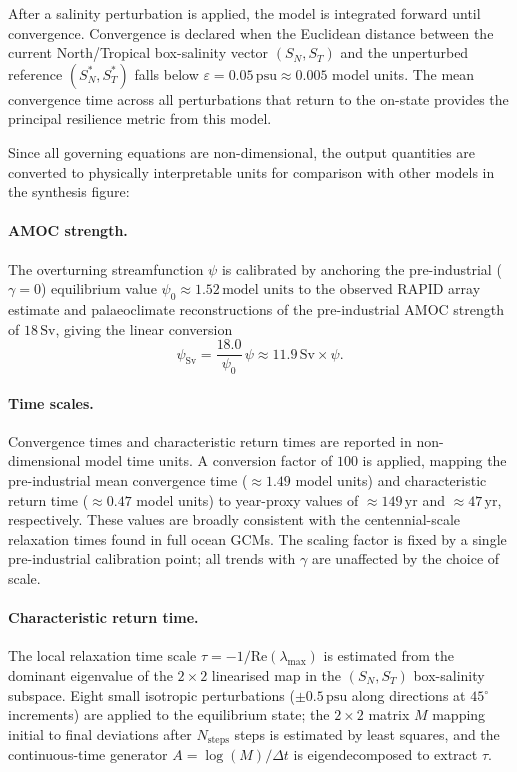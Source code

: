 \documentclass[12pt, a4paper]{article}
\newcommand{\psu}{\,\text{psu}}
\begin{document}
After a salinity perturbation is applied, the model is integrated forward
until convergence. Convergence is declared when the Euclidean distance between
the current North/Tropical box-salinity vector $(S_N, S_T)$ and the
unperturbed reference $(S_N^*, S_T^*)$ falls below
$\varepsilon = 0.05\psu{} \approx 0.005$ model units. The mean convergence
time across all perturbations that return to the on-state provides the
principal resilience metric from this model.

Since all governing equations are non-dimensional, the output quantities are
converted to physically interpretable units for comparison with other models
in the synthesis figure:

\paragraph{AMOC strength.}
The overturning streamfunction $\psi$ is calibrated by anchoring the
pre-industrial ($\gamma = 0$) equilibrium value
$\psi_0 \approx 1.52\,\text{model units}$ to the observed RAPID array estimate
and palaeoclimate reconstructions of the pre-industrial AMOC strength of
$18\,\text{Sv}$, giving the linear conversion
\begin{equation}
  \psi_\mathrm{Sv} = \frac{18.0}{\psi_0}\,\psi
  \approx 11.9\,\text{Sv}\times\psi.
\end{equation}

\paragraph{Time scales.}
Convergence times and characteristic return times are reported in
non-dimensional model time units. A conversion factor of $100$ is applied,
mapping the pre-industrial mean convergence time ($\approx 1.49$ model units)
and characteristic return time ($\approx 0.47$ model units) to year-proxy
values of $\approx 149\,\text{yr}$ and $\approx 47\,\text{yr}$, respectively.
These values are broadly consistent with the centennial-scale relaxation times
found in full ocean GCMs. The scaling factor is fixed by a single pre-industrial
calibration point; all trends with $\gamma$ are unaffected by the choice of
scale.

\paragraph{Characteristic return time.}
The local relaxation time scale $\tau = -1/\mathrm{Re}(\lambda_\mathrm{max})$
is estimated from the dominant eigenvalue of the $2\times2$ linearised map
in the $(S_N, S_T)$ box-salinity subspace. Eight small isotropic perturbations
($\pm 0.5\psu{}$ along directions at $45{^\circ}$ increments) are applied to the
equilibrium state; the $2\times2$ matrix $M$ mapping initial to final
deviations after $N_\mathrm{steps}$ steps is estimated by least squares, and
the continuous-time generator $A = \log(M)/\Delta t$ is eigendecomposed to
extract $\tau$.
\end{document}
